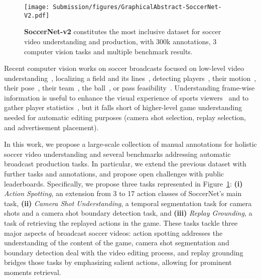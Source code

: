 \documentclass[final]{cvsports}
\begin{document}
\begin{figure}
    \centering
    \texttt{[image: Submission/figures/GraphicalAbstract-SoccerNet-V2.pdf]}
\caption{\textbf{SoccerNet-v2} constitutes the most inclusive dataset for soccer video understanding and production, with \texttildelow 300k annotations, 3 computer vision tasks and multiple benchmark results.}
    \label{fig:Pooling}
\end{figure}

Recent computer vision works on soccer broadcasts focused on low-level video understanding~\cite{moeslund2014computer}, \eg
localizing a field and its lines~\cite{Cioppa2018ABottom,farin2003robust,homayounfar2017sports}, 
detecting players~\cite{Cioppa_2019_CVPR_Workshops,yang2017robust}, 
their motion~\cite{felsen2017will,manafifard2017survey}, 
their pose~\cite{Bridgeman_2019_CVPR_Workshops, Zecha_2019_CVPR_Workshops}, 
their team~\cite{Istasse_2019_CVPR_Workshops}, 
the ball~\cite{Sarkar_2019_CVPR_Workshops,Theagarajan_2018_CVPR_Workshops},
or pass feasibility~\cite{Sangesa2020UsingPB}.
Understanding frame-wise information is useful to enhance the visual experience of sports viewers~\cite{Rematas_2018_CVPR} and to gather player statistics~\cite{thomas2017computer}, but it falls short of higher-level game understanding needed for automatic editing purposes (\eg camera shot selection, replay selection, and advertisement placement).






In this work, we propose a large-scale collection of manual annotations  for holistic soccer video understanding and several benchmarks addressing automatic broadcast production tasks. In particular, we extend the previous \SoccerNet dataset with further tasks and annotations, and propose open challenges with public leaderboards. Specifically, we propose three tasks represented in Figure~\ref{fig:Pooling}:
\textbf{(i)} \textit{Action Spotting}, an extension from 3 to 17 action classes of SoccerNet's main task,
\textbf{(ii)} \textit{Camera Shot Understanding}, a temporal segmentation task for camera shots and a camera shot boundary detection task, 
and \textbf{(iii)} \textit{Replay Grounding}, a task of retrieving the replayed actions in the game. These tasks tackle three major aspects of broadcast soccer videos: action spotting addresses the understanding of the content of the game, camera shot segmentation and boundary detection deal with the video editing process, and replay grounding bridges those tasks by emphasizing salient actions, allowing for prominent moments retrieval. 
\end{document}
